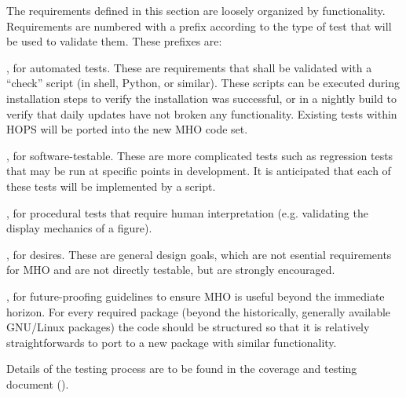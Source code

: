 The requirements defined in this section are loosely organized by functionality.
Requirements are numbered with a prefix according to
the type of test that will be used to validate them.  These prefixes are:
\begin{description}
[align=left, labelwidth=0.0cm, leftmargin=1cm]
\item[A], for automated tests. These are requirements
that shall be validated with a ``check'' script (in shell, Python, or similar).
These scripts can be executed during installation steps to verify the
installation was successful,
or in a nightly build to verify that daily updates have not broken any
functionality. Existing tests within \ac{HOPS} will be ported into the new
\ac{MHO} code set.

\item[S], for software-testable. These are more complicated tests such as
regression tests that may be run at specific points in development. It is
anticipated that each of these tests will be implemented by a script.

\item[P], for procedural tests that require human interpretation (e.g. validating
the display mechanics of a figure). 

\item[D], for desires. These are general design goals, which are not
esential requirements for \acs{MHO} and are not directly testable,
but are strongly encouraged.

\item[F], for future-proofing guidelines to ensure \acs{MHO} is useful beyond
the immediate horizon. For every required package (beyond the historically,
generally available GNU/Linux packages) the code should be structured
so that it is relatively straightforwards to port to a new package with
similar functionality.

\end{description}

Details of the testing process are to be found in the coverage
and testing document (\cite{cover}).




